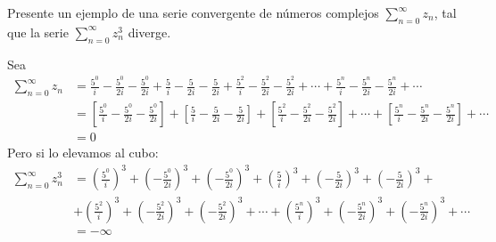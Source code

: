 \begin{problema}[10p]
    Presente un ejemplo de una serie convergente de números complejos $\sum_{n=0}^{\infty} z_n$, tal que la serie $\sum_{n=0}^{\infty} z_n^3$ diverge.
    \begin{sol}
        Sea 
        \begin{align*}
            \sum_{n=0}^{\infty} z_n &=
            \frac{5^0}{i}-\frac{5^0}{2i}-\frac{5^0}{2i}+\frac{5}{i}-\frac{5}{2i}-\frac{5}{2i}+\frac{5^2}{i}-\frac{5^2}{2i}-\frac{5^2}{2i}+\cdots+\frac{5^n}{i}-\frac{5^n}{2i}-\frac{5^n}{2i}+\cdots\\
            &= \left[\frac{5^0}{i}-\frac{5^0}{2i}-\frac{5^0}{2i}\right]+\left[\frac{5}{i}-\frac{5}{2i}-\frac{5}{2i}\right]+\left[\frac{5^2}{i}-\frac{5^2}{2i}-\frac{5^2}{2i}\right]+\cdots+\left[\frac{5^n}{i}-\frac{5^n}{2i}-\frac{5^n}{2i}\right]+\cdots\\
            &= 0
        \end{align*}
        Pero si lo elevamos al cubo:
        \begin{align*}
            \sum_{n=0}^{\infty} z_n^3 &=
            \left(\frac{5^0}{i}\right)^3+\left(-\frac{5^0}{2i}\right)^3+\left(-\frac{5^0}{2i}\right)^3+\left(\frac{5}{i}\right)^3+\left(-\frac{5}{2i}\right)^3+\left(-\frac{5}{2i}\right)^3+\\
            &+\left(\frac{5^2}{i}\right)^3+\left(-\frac{5^2}{2i}\right)^3+\left(-\frac{5^2}{2i}\right)^3+\cdots + \left(\frac{5^n}{i}\right)^3+\left(-\frac{5^n}{2i}\right)^3+\left(-\frac{5^n}{2i}\right)^3+\cdots\\
            &=-\infty
        \end{align*}
    \end{sol}
\end{problema}

